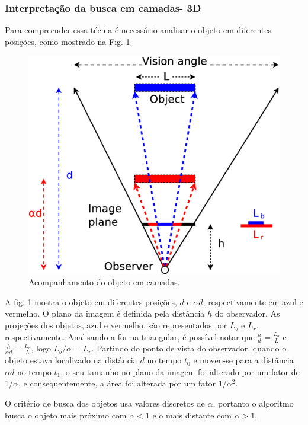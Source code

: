 

\subsubsection{Interpretação da busca em camadas- 3D}

Para compreender essa técnia é necessário analisar o objeto 
em diferentes posições, como mostrado na Fig. \ref{fig:multiscale3d}.

\begin{figure}[H]
\centering
  \includegraphics[width=.7\columnwidth]{images/Diagrama3.eps}
  \caption{ Acompanhamento do objeto em camadas.}
  \label{fig:multiscale3d}
\end{figure}

A fig. \ref{fig:multiscale3d} mostra o objeto em diferentes posições, 
$d$ e $\alpha d$, respectivamente em azul e vermelho.
O plano da imagem é definida pela distância $h$ do observador. As projeções dos objetos,
azul e vermelho, são representados por $L_b$ e $L_r$, respectivamente. Analisando a forma
triangular, é possível notar que $\frac{h}{d}=\frac{L_b}{L}$ e $\frac{h}{\alpha d}=\frac{L_r}{L}$, logo 
$L_b/\alpha= L_r$. 
Partindo do ponto de vista do observador, quando o objeto estava localizado na distância $d$ no tempo
$t_0$ e moveu-se para a distância $\alpha d$ no tempo $t_1$, o seu tamanho no plano da imagem 
foi alterado por um fator de 1/$\alpha$, e consequentemente, a área foi alterada por um fator 1/$\alpha^2$.

O critério de busca dos objetos usa valores discretos de $\alpha$, portanto o algoritmo busca o objeto
mais próximo com $\alpha<1$ e o mais distante com $\alpha>1$.



